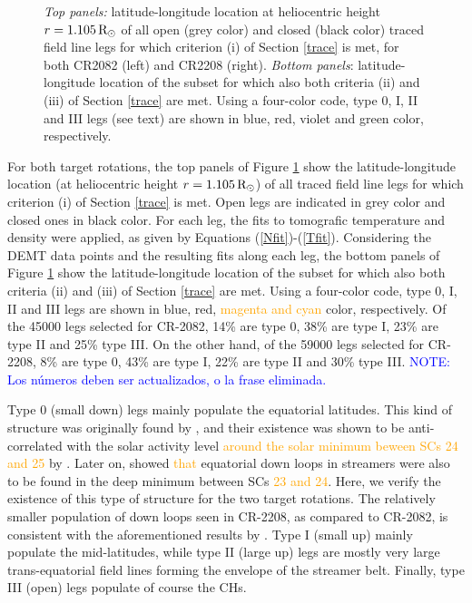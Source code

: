 \documentclass[namedreferences]{solarphysics}
\newcommand{\mrsun}{{\rm R_\odot}}
\def\albert#1{\textcolor{orange}{#1}}
\def\notebyalbert#1{\textcolor{blue}{NOTE: #1}}
\begin{document}
\begin{article}
\begin{figure}[h!]
\begin{center}
\caption{\emph{Top panels:} {latitude-longitude location at heliocentric height $r=1.105\,\mrsun$ of all open (grey color) and closed (black color) traced field line legs for which criterion (i) of Section \ref{trace} is met, for both CR2082 (left) and CR2208 (right). \emph{Bottom panels}: latitude-longitude location of the subset for which also both criteria (ii) and (iii) of Section \ref{trace} are met. Using a four-color code, type 0, I, II and III legs (see text) are shown in blue, red, violet and green color, respectively.}}
\label{rpoint_demt}
\end{center}
\end{figure}

{For both target rotations, the top panels of Figure \ref{rpoint_demt} show the latitude-longitude location (at heliocentric height $r=1.105\,\mrsun$) of all traced field line legs for which criterion (i) of Section \ref{trace} is met. Open legs are indicated in grey color and closed ones in black color. For each leg, the fits to tomografic temperature and density were applied, as given by Equations (\ref{Nfit})-(\ref{Tfit}). Considering the DEMT data points and the resulting fits along each leg, the bottom panels of Figure \ref{rpoint_demt} show the latitude-longitude location of the subset for which also both criteria (ii) and (iii) of Section \ref{trace} are met. Using a four-color code, type 0, I, II and III legs are shown in blue, red, \albert{magenta and cyan} color, respectively.} {Of the 45000 legs selected for CR-2082, 14\% are type 0, 38\% are type I, 23\% are type II and 25\% type III. On the other hand, of the 59000 legs selected for CR-2208, 8\% are type 0, 43\% are type I, 22\% are type II and 30\% type III.} \notebyalbert{Los números deben ser actualizados, o la frase eliminada.}

{Type 0 (small down) legs mainly populate the equatorial latitudes. This kind of structure was originally found by \citet{huang_2012}, and their existence was shown to be anti-correlated with the solar activity level \albert{around the solar minimum beween SCs 24 and 25} by \citet{nuevo_2013}. Later on, \citet{lloveras_2017} showed \albert{that} equatorial down loops in streamers were also to be found in the deep minimum between SCs \albert{23 and 24}. Here, we verify the existence of this type of structure for the two target rotations. The relatively smaller population of down loops seen in CR-2208, as compared to CR-2082, is consistent with the aforementioned results by \citet{nuevo_2013}. Type I (small up) mainly populate the mid-latitudes, while type II (large up) legs are mostly very large trans-equatorial field lines forming the envelope of the streamer belt. Finally, type III (open) legs populate of course the CHs.}


\end{article}
\end{document}
